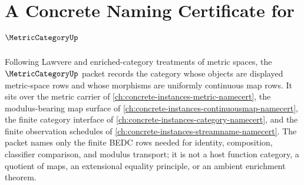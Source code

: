 \chapter{A Concrete Naming Certificate for $\MetricCategoryUp$}
\label{ch:concrete-instances-metric-category-namecert}

Following Lawvere and enriched-category treatments of metric spaces, the $\MetricCategoryUp$ packet records the category whose objects are displayed metric-space rows and whose morphisms are uniformly continuous map rows. It sits over the metric carrier of \autoref{ch:concrete-instances-metric-namecert}, the modulus-bearing map surface of \autoref{ch:concrete-instances-continuousmap-namecert}, the finite category interface of \autoref{ch:concrete-instances-category-namecert}, and the finite observation schedules of \autoref{ch:concrete-instances-streamname-namecert}. The packet names only the finite BEDC rows needed for identity, composition, classifier comparison, and modulus transport; it is not a host function category, a quotient of maps, an extensional equality principle, or an ambient enrichment theorem.

